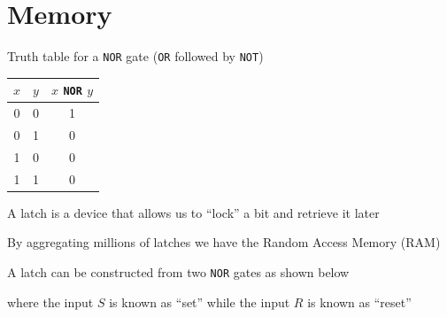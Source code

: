 \documentclass[8pt,a4paper,compress]{beamer}
\begin{document}
\section{Memory}
\begin{frame}[fragile]
\pause

Truth table for a \lstinline{NOR} gate (\lstinline{OR} followed by \lstinline{NOT})
\begin{center}
\begin{tabular}{cc|c}
$x$ & $y$ & $x$ \lstinline$NOR$ $y$ \\ \hline
0 & 0 & 1 \\
0 & 1 & 0 \\
1 & 0 & 0 \\
1 & 1 & 0
\end{tabular}
\end{center}

\pause
\bigskip

A latch is a device that allows us to ``lock'' a bit and retrieve it later

\pause
\bigskip

By aggregating millions of latches we have the Random Access Memory (RAM)

\pause
\bigskip

A latch can be constructed from two \lstinline{NOR} gates as shown below
\begin{center}
\end{center}
where the input $S$ is known as ``set'' while the input $R$ is known as ``reset''
\end{frame}
\end{document}

